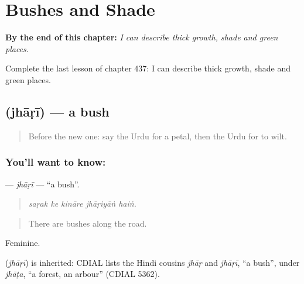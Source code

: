 
\chapter{Bushes and Shade}
\label{ch:ur-bushes-and-shade}

\begin{chapteropening}
\textbf{By the end of this chapter:} \emph{I can describe thick growth, shade and green places.}

Complete the last lesson of chapter 437: I can describe thick growth, shade and green places.
\end{chapteropening}

\section[\texorpdfstring{\ur{جھاڑی} (jhāṛī)}{جھاڑی (jhāṛī)}]{ (jhāṛī) — a bush}

\label{lesson:UR-C437-jhari}



\begin{quote}
Before the new one: say the Urdu for a petal, then the Urdu for to wilt.
\end{quote}

\subsection*{You'll want to know: }
\textbf{} — \emph{jhāṛī} — \textquotedblleft{}a bush\textquotedblright{}.

\begin{quote}
    
\end{quote}

\begin{quote}
\emph{saṛak ke kināre jhāṛiyāṅ haiṅ.}
\end{quote}

\begin{quote}
There are bushes along the road.
\end{quote}

Feminine.

\begin{cousinweb}
\textbf{} (\emph{jhāṛī}) is inherited: CDIAL lists the Hindi cousins \emph{jhāṛ} and \emph{jhāṛī}, \textquotedblleft{}a bush\textquotedblright{}, under \emph{jhāṭa}, \textquotedblleft{}a forest, an arbour\textquotedblright{} (CDIAL 5362).
\end{cousinweb}

